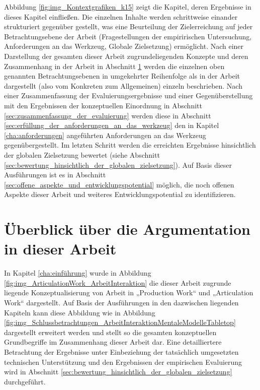 Abbildung \ref{fig:img_Kontextgrafiken_k15} zeigt die Kapitel, deren Ergebnisse in dieses Kapitel einfließen. Die einzelnen Inhalte werden schrittweise einander strukturiert gegenüber gestellt, was eine Beurteilung der Zielerreichung auf jeder Betrachtungsebene der Arbeit (Fragestellungen der empiririschen Untersuchung, Anforderungen an das Werkzeug, Globale Zielsetzung) ermöglicht. Nach einer Darstellung der gesamten dieser Arbeit zugrundeliegenden Konzepte und deren Zusammenhang in der Arbeit in Abschnitt \ref{sec:überblick_über_den_gesamtzusammenhang} werden die einzelnen oben genannten Betrachtungsebenen in umgekehrter Reihenfolge als in der Arbeit dargestellt (also vom Konkreten zum Allgemeinen) einzeln beschrieben. Nach einer Zusammenfassung der Evaluierungsergebnisse und einer Gegenüberstellung mit den Ergebnissen der konzeptuellen Einordnung in Abschnitt \ref{sec:zusammenfassung_der_evaluierung} werden diese in Abschnitt \ref{sec:erfüllung_der_anforderungen_an_das_werkzeug} den in Kapitel \ref{cha:anforderungen} angeführten Anforderungen an das Werkzeug gegenübergestellt. Im letzten Schritt werden die erreichten Ergebnisse hinsichtlich der globalen Zielsetzung bewertet (siehe Abschnitt \ref{sec:bewertung_hinsichtlich_der_globalen_zielsetzung}). Auf Basis dieser Ausführungen ist es in Abschnitt \ref{sec:offene_aspekte_und_entwicklungspotential} möglich, die noch offenen Aspekte dieser Arbeit und weiteres Entwicklungspotential zu identifizieren.

\section{Überblick über die Argumentation in dieser Arbeit} %
\label{sec:überblick_über_den_gesamtzusammenhang}

In Kapitel \ref{cha:einführung} wurde in Abbildung \ref{fig:img_ArticulationWork_ArbeitInteraktion} die dieser Arbeit zugrunde liegende Konzeptualisierung von Arbeit in „Production Work“ und „Articulation Work“ dargestellt. Auf Basis der Ausführungen in den dazwischen liegenden Kapiteln kann diese Abbildung wie in Abbildung \ref{fig:img_Schlussbetrachtungen_ArbeitInteraktionMentaleModelleTabletop} dargestellt erweitert werden und stellt so die gesamten konzeptuellen Grundbegriffe im Zusammenhang dieser Arbeit dar. Eine detailliertere Betrachtung der Ergebnisse unter Einbeziehung der tatsächlich umgesetzten technischen Unterstützung und den Ergebnissen der empirischen Evaluierung wird in Abschnitt \ref{sec:bewertung_hinsichtlich_der_globalen_zielsetzung} durchgeführt.

